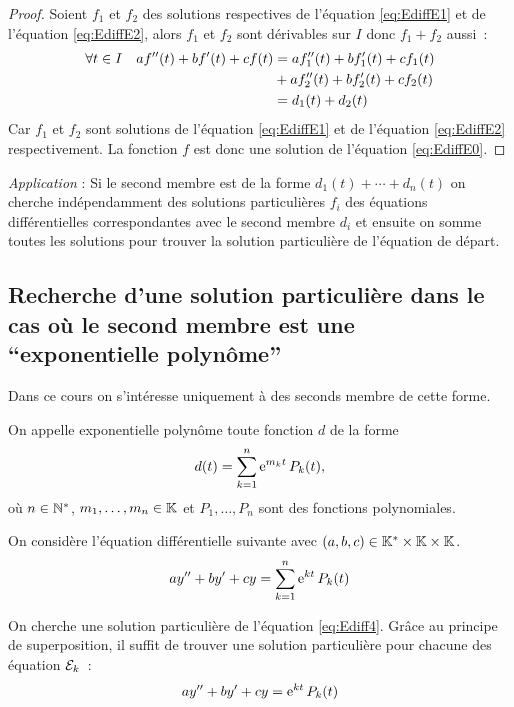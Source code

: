 \begin{proof}
  Soient \(f_1\) et \(f_2\) des solutions respectives de l'équation
  \eqref{eq:EdiffE1} et de l'équation \eqref{eq:EdiffE2}, alors \(f_1\) et
  \(f_2\) sont dérivables sur \(I\) donc \(f_1 + f_2\) aussi~:
  \begin{align}
    \forall t \in I \quad af''(t) + bf'(t) + cf(t)& = af_1''(t) + bf_1'(t) +
    cf_1(t) \notag \\
                                                  &+ af_2''(t) + bf_2'(t) +
    cf_2(t)\\ & = d_1(t) + d_2(t)
  \end{align}
  Car \(f_1\) et \(f_2\) sont solutions de l'équation \eqref{eq:EdiffE1} et de
  l'équation \eqref{eq:EdiffE2} respectivement. La fonction \(f\) est donc une
  solution de l'équation \eqref{eq:EdiffE0}.
\end{proof}

\emph{Application} : Si le second membre est de la forme \(d_1(t)+ \dotsb  +
d_n(t)\) on cherche indépendamment des solutions particulières \(f_i\) des
équations différentielles correspondantes avec le second membre \(d_i\) et
ensuite on somme toutes les solutions pour trouver la solution particulière de
l'équation de départ.

\subsection{Recherche d'une solution particulière dans le cas où le second
membre est une ``exponentielle polynôme''}
\label{subsec:recherchesolutionpartexppol}

Dans ce cours on s'intéresse uniquement à des seconds membre de cette forme.

\begin{defdef}
  On appelle exponentielle polynôme toute fonction \(d\) de la forme
  \begin{equation}
    d(t) = \sum_{k = 1}^{n} \operatorname{e}^{m_k t} P_k (t),
  \end{equation}
  où \(n \in \mathbb{N}^*\), \(m_1, \ldots, m_n \in \mathbb{K}\) et \( P_1, \ldots, P_n\) sont
  des fonctions polynomiales.
\end{defdef}
On considère l'équation différentielle  suivante avec \((a,b,c) \in
\mathbb{K}^{*}\times\mathbb{K}\times\mathbb{K}\).
\begin{equation}
  \label{eq:Ediff4}
  ay'' + by' + cy = \sum_{k = 1}^{n} \operatorname{e}^{kt} P_k(t)
\end{equation}

On cherche une solution particulière de l'équation \eqref{eq:Ediff4}. Grâce au
principe de superposition, il suffit de trouver une solution particulière pour
chacune des équation \(\mathcal{E}_k\)~:
\begin{equation}
  \label{eq:Ediffk}
  ay'' + by' + cy= \operatorname{e}^{kt} P_k(t)
\end{equation}

